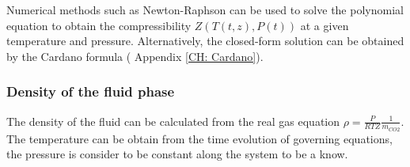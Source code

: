 \documentclass[../Article_Model_Parameters.tex]{subfiles}
\begin{document}
	Numerical methods such as Newton-Raphson can be used to solve the polynomial equation to obtain the compressibility $Z\left(T(t,z), P(t)\right)$ at a given temperature and pressure. Alternatively, the closed-form solution can be obtained by the Cardano formula ( Appendix \ref{CH: Cardano}).
	
	\subsubsection{Density of the fluid phase} \label{subsubsec: Fluid density}
	
	The density of the fluid can be calculated from the real gas equation $\rho = \frac{P}{RTZ} \frac{1}{m_{CO2}}$. The temperature can be obtain from the time evolution of governing equations, the pressure is consider to be constant along the system to be a know. 
	
\end{document}
